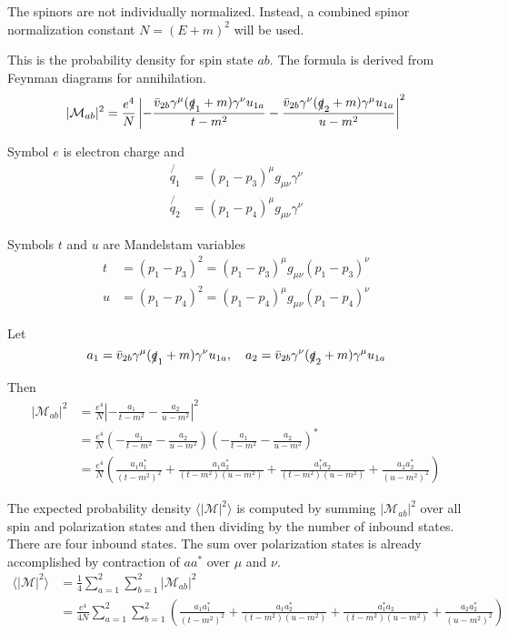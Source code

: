 \documentclass[12pt]{article}
\begin{document}
The spinors are not individually normalized.
Instead, a combined spinor normalization constant $N=(E+m)^2$ will be used.

\bigskip
This is the probability density for spin state $ab$.
The formula is derived from Feynman diagrams for annihilation.
\begin{equation*}
|\mathcal{M}_{ab}|^2
=
\frac{e^4}{N}
\left|
-\frac{\bar{v}_{2b}\gamma^\mu(\slashed{q}_1+m)\gamma^\nu u_{1a}}{t-m^2}
-\frac{\bar{v}_{2b}\gamma^\nu(\slashed{q}_2+m)\gamma^\mu u_{1a}}{u-m^2}
\right|^2
\end{equation*}

Symbol $e$ is electron charge and
\begin{align*}
\not{\!q_1}&=(p_1-p_3)^\mu g_{\mu\nu}\gamma^\nu
\\
\not{\!q_2}&=(p_1-p_4)^\mu g_{\mu\nu}\gamma^\nu
\end{align*}

Symbols $t$ and $u$ are Mandelstam variables
\begin{align*}
t&=(p_1-p_3)^2=(p_1-p_3)^\mu g_{\mu\nu}(p_1-p_3)^\nu
\\
u&=(p_1-p_4)^2=(p_1-p_4)^\mu g_{\mu\nu}(p_1-p_4)^\nu
\end{align*}

Let
\begin{equation*}
a_1=\bar{v}_{2b}\gamma^\mu(\slashed{q}_1+m)\gamma^\nu u_{1a},
\quad
a_2=\bar{v}_{2b}\gamma^\nu(\slashed{q}_2+m)\gamma^\mu u_{1a}
\end{equation*}

Then
\begin{align*}
|\mathcal{M}_{ab}|^2&=\frac{e^4}{N}\left|-\frac{a_1}{t-m^2}-\frac{a_2}{u-m^2}\right|^2\\
&=
\frac{e^4}{N}
\left(-\frac{a_1}{t-m^2}-\frac{a_2}{u-m^2}\right)
\left(-\frac{a_1}{t-m^2}-\frac{a_2}{u-m^2}\right)^*\\
&=
\frac{e^4}{N}\left(
\frac{a_1a_1^*}{(t-m^2)^2}
+\frac{a_1a_2^*}{(t-m^2)(u-m^2)}
+\frac{a_1^*a_2}{(t-m^2)(u-m^2)}
+\frac{a_2a_2^*}{(u-m^2)^2}
\right)
\end{align*}

The expected probability density $\langle|\mathcal{M}|^2\rangle$
is computed by summing $|\mathcal{M}_{ab}|^2$ over all spin and polarization states
and then dividing by the number of inbound states.
There are four inbound states.
The sum over polarization states is already accomplished by contraction
of $aa^*$ over $\mu$ and $\nu$.
\begin{align*}
\langle|\mathcal{M}|^2\rangle
&=\frac{1}{4}\sum_{a=1}^2\sum_{b=1}^2|\mathcal{M}_{ab}|^2\\
&=\frac{e^4}{4N}\sum_{a=1}^2\sum_{b=1}^2
\left(
\frac{a_1a_1^*}{(t-m^2)^2}
+\frac{a_1a_2^*}{(t-m^2)(u-m^2)}
+\frac{a_1^*a_2}{(t-m^2)(u-m^2)}
+\frac{a_2a_2^*}{(u-m^2)^2}
\right)
\end{align*}
\end{document}
